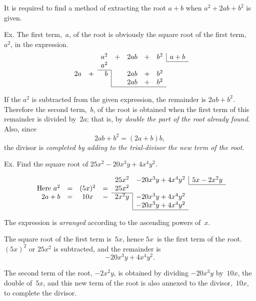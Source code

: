 \documentclass[12pt]{book}[2005/09/16]
\makeatletter
\newcommand{\ScreenBreak}{\ifthenelse{\not\boolean{ForPrinting}}{\newpage}{}}
\newenvironment{Soln}[1][]{\par\small\textsc{#1}}{\par}
\newcommand{\DPtypo}[2]{#2}
\newcommand{\Add}[1]{\DPtypo{}{#1}}
\newcommand{\TbBar}[1]{\multicolumn{1}{@{}r|}{#1}}
\makeatother
\begin{document}
It is required to find a method of extracting the root
$a + b$ when $a^{2} + 2ab + b^{2}$ is given.
\begin{Soln}
Ex.  The first term,~$a$, of the root is obviously the square root of
the first term,~$a^{2}$, in the expression.
\[
\begin{array}{r*{3}{cr}l}
   & &   a^{2} &+& 2ab &+& \TbBar{b^{2}} & a + b \\
\cline{8-8}
   & &   a^{2} \\
\cline{3-3}
2a &+& \TbBar{b} & & 2ab &+& b^{2} \\
   & & \TbBar{ } & & 2ab &+& b^{2} \\
\cline{4-7}
\end{array}
\]

If the $a^{2}$ is subtracted from the given
expression, the remainder is $2ab + b^{2}$\Add{.}
Therefore the second term,~$b$, of the root
is obtained when the first term of this
remainder is divided by~$2a$; that is, by
\emph{double the part of the root already found}.  Also, since
\[
2ab + b^{2} = (2a + b)b,
\]
the divisor is \emph{completed by adding to the trial-divisor the new term of
the root}\Add{.}
\end{Soln}

\ScreenBreak
Ex.  Find the square root of $25x^{2} - 20x^{3}y + 4x^{4}y^{2}$.
\begin{Soln}
\[
\begin{array}{rcccrll}
&     && & 25x^{2} & \TbBar{-20 x^{3}y + 4x^{4}y^{2}} & 5x - 2x^{2}y \\
\cline{7-7}
\text{Here $a^{2}$}
       &=& (5x)^{2} &=& 25x^{2} \\
\cline{5-5}
2a + b &=& 10x &-& \TbBar{2x^{2}y} & -20x^{3}y + 4x^{4}y^{2} \\
       & &     & & \TbBar{ }       & -20x^{3}y + 4x^{4}y^{2} \\
\cline{6-6}
\end{array}
\]

The expression is \emph{arranged} according to the ascending powers of~$x$\Add{.}

The square root of the first term is~$5x$, hence $5x$~is the first term
of the root.  $(5x)^{2}$ or $25x^{2}$ is subtracted, and the remainder is
\[
-20x^{3}y + 4x^{4}y^{2}.
\]

The second term of the root, $-2x^{2}y$, is obtained by dividing
$-20x^{3}y$ by~$10x$, the double of~$5x$, and this new term of the root is
also annexed to the divisor,~$10x$, to complete the divisor.
\end{Soln}
\end{document}
